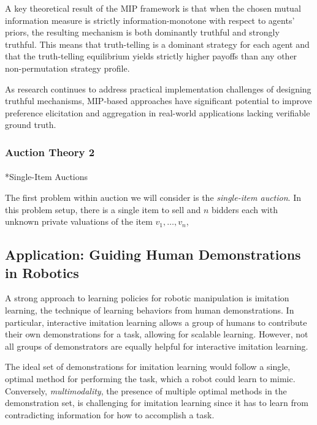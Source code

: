 \documentclass[
  letterpaper,
  numbers=noenddot,
  DIV=11]{scrreprt}
\makeatletter
\let\oldparagraph\paragraph
\renewcommand{\paragraph}{
    \@ifstar
      \xxxParagraphStar
      \xxxParagraphNoStar
  }
\newcommand{\xxxParagraphStar}[1]{\oldparagraph*{#1}\mbox{}}
\newcommand{\xxxParagraphNoStar}[1]{\oldparagraph{#1}\mbox{}}
\theoremstyle{definition}
\theoremstyle{plain}
\theoremstyle{plain}
\theoremstyle{remark}
\makeatother
\begin{document}
A key theoretical result of the MIP framework is that when the chosen
mutual information measure is strictly information-monotone with respect
to agents' priors, the resulting mechanism is both dominantly truthful
and strongly truthful. This means that truth-telling is a dominant
strategy for each agent and that the truth-telling equilibrium yields
strictly higher payoffs than any other non-permutation strategy profile.

As research continues to address practical implementation challenges of
designing truthful mechanisms, MIP-based approaches have significant
potential to improve preference elicitation and aggregation in
real-world applications lacking verifiable ground truth.

\subsubsection*{Auction Theory 2}\label{auction-theory-2}

\paragraph*{Single-Item Auctions}\label{single-item-auctions-1}

The first problem within auction we will consider is the
\emph{single-item auction}. In this problem setup, there is a single
item to sell and \(n\) bidders each with unknown private valuations of
the item \(v_1, \ldots, v_n\),

\subsection{Application: Guiding Human Demonstrations in
Robotics}\label{application-guiding-human-demonstrations-in-robotics}

A strong approach to learning policies for robotic manipulation is
imitation learning, the technique of learning behaviors from human
demonstrations. In particular, interactive imitation learning allows a
group of humans to contribute their own demonstrations for a task,
allowing for scalable learning. However, not all groups of demonstrators
are equally helpful for interactive imitation learning.

The ideal set of demonstrations for imitation learning would follow a
single, optimal method for performing the task, which a robot could
learn to mimic. Conversely, \emph{multimodality}, the presence of
multiple optimal methods in the demonstration set, is challenging for
imitation learning since it has to learn from contradicting information
for how to accomplish a task.
\end{document}
